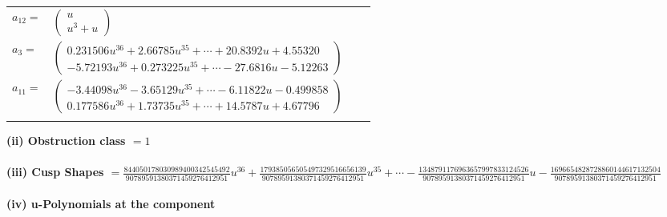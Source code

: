 \documentclass[1p]{elsarticle_modified}
\theoremstyle{definition}
\begin{document}
\begin{tabular}{m{7pt} m{180pt} m{7pt} m{180pt} }
\flushright $a_{12}=$&$\begin{pmatrix}u\\u^3+u\end{pmatrix}$ \\
\flushright $a_{3}=$&$\begin{pmatrix}0.231506 u^{36}+2.66785 u^{35}+\cdots+20.8392 u+4.55320\\-5.72193 u^{36}+0.273225 u^{35}+\cdots-27.6816 u-5.12263\end{pmatrix}$ \\
\flushright $a_{11}=$&$\begin{pmatrix}-3.44098 u^{36}-3.65129 u^{35}+\cdots-6.11822 u-0.499858\\0.177586 u^{36}+1.73735 u^{35}+\cdots+14.5787 u+4.67796\end{pmatrix}$\\&\end{tabular}
\flushleft \textbf{(ii) Obstruction class $= 1$}\\~\\
\flushleft \textbf{(iii) Cusp Shapes $= \frac{844050178030989400342545492}{90789591380371459276412951} u^{36}+\frac{179385056505497329516656139}{90789591380371459276412951} u^{35}+\cdots-\frac{1348791176963657997833124526}{90789591380371459276412951} u-\frac{1696654828728860144617132504}{90789591380371459276412951}$}\\~\\
\newpage\renewcommand{\arraystretch}{1}
\flushleft \textbf{(iv) u-Polynomials at the component}\newline \\
\end{document}
